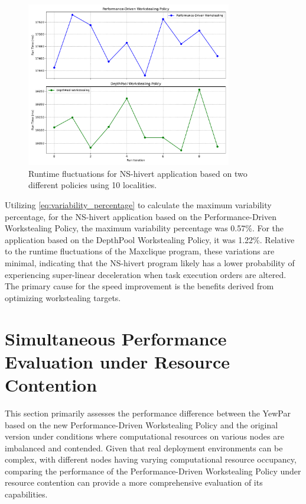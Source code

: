 \documentclass{mproj}
\begin{document}
\begin{figure}[h]
    \centering
    \includegraphics[width=0.8\textwidth]{images/NS_hivert_fluctuations.pdf}
    \caption{Runtime fluctuations for NS-hivert application based on two different policies using 10 localities.}
    \label{fig:NS_hivert_fluctuations}
\end{figure}
\FloatBarrier

Utilizing \cref{eq:variability_percentage} to calculate the maximum variability percentage,
for the NS-hivert application based on the Performance-Driven Workstealing Policy,
the maximum variability percentage was 0.57\%.
For the application based on the DepthPool Workstealing Policy, it was 1.22\%.
Relative to the runtime fluctuations of the Maxclique program, these variations are minimal,
indicating that the NS-hivert program likely has a lower probability of experiencing super-linear deceleration when task execution orders are altered.
The primary cause for the speed improvement is the benefits derived from optimizing workstealing targets.

\section{Simultaneous Performance Evaluation under Resource Contention}

This section primarily assesses the performance difference between the YewPar based on the new Performance-Driven Workstealing Policy and the original version under conditions where computational resources on various nodes are imbalanced and contended.
Given that real deployment environments can be complex, with different nodes having varying computational resource occupancy,
comparing the performance of the Performance-Driven Workstealing Policy under resource contention can provide a more comprehensive evaluation of its capabilities.
\end{document}
